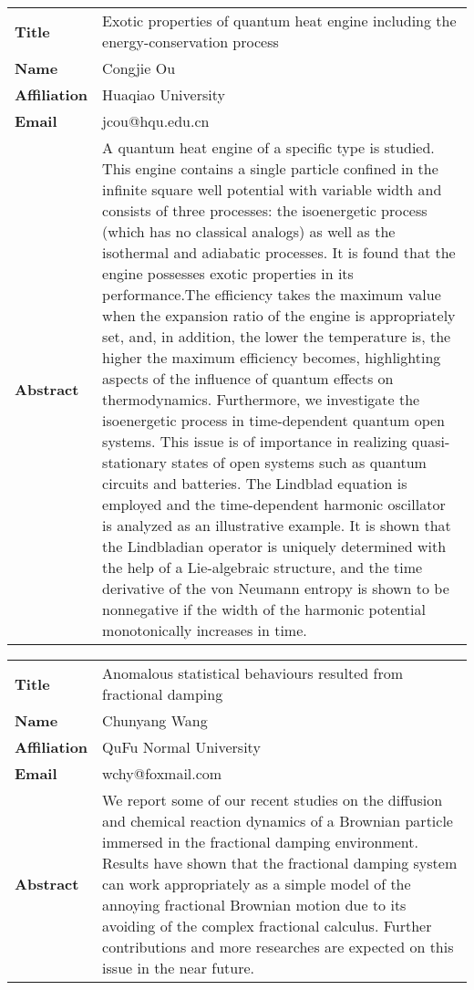 \documentclass[oneside,A4paper,12pt]{article}
\begin{document}
\newpage
\begin{longtable}{p{2cm}p{14cm}}
\toprule
\textbf{Title} & Exotic properties of quantum heat engine including the energy-conservation process\\
\textbf{Name} & Congjie Ou\\
\textbf{Affiliation} & Huaqiao University\\
\textbf{Email} & jcou@hqu.edu.cn\\
\textbf{Abstract} & A quantum heat engine of a specific type is studied. This engine contains a single particle confined in the infinite square well potential with variable width and consists of three processes: the isoenergetic process (which has no classical analogs) as well as the isothermal and adiabatic processes. It is found that the engine possesses exotic properties in its performance.The efficiency takes the maximum value when the expansion ratio of the engine is appropriately set, and, in addition, the lower the temperature is, the higher the maximum efficiency becomes, highlighting aspects of the influence of quantum effects on thermodynamics. Furthermore, we investigate the isoenergetic process in time-dependent quantum open systems. This issue is of importance in realizing quasi-stationary states of open systems such as quantum circuits and batteries. The Lindblad equation is employed and the time-dependent harmonic oscillator is analyzed as an illustrative example. It is shown that the Lindbladian operator is uniquely determined with the help of a Lie-algebraic structure, and the time derivative of the von Neumann entropy is shown to be nonnegative if the width of the harmonic potential monotonically increases in time.\\
\bottomrule
\end{longtable}


\newpage
\begin{longtable}{p{2cm}p{14cm}}
\toprule
\textbf{Title} & Anomalous statistical behaviours resulted from fractional damping\\
\textbf{Name} & Chunyang Wang\\
\textbf{Affiliation} & QuFu Normal University\\
\textbf{Email} & wchy@foxmail.com\\
\textbf{Abstract} & We report some of our recent studies on the diffusion and chemical reaction dynamics of a Brownian particle immersed in the fractional damping environment. Results have shown that the fractional damping system can work appropriately as a simple model of the annoying fractional Brownian motion due to its avoiding of the complex fractional calculus. Further contributions and more researches are expected on this issue in the near future.\\
\bottomrule
\end{longtable}
\end{document}
